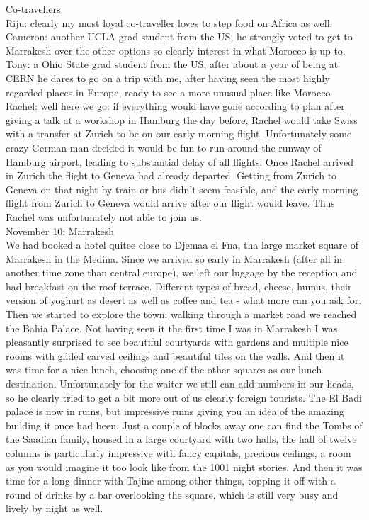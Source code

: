 Co-travellers:\\
Riju: clearly my most loyal co-traveller loves to step food on Africa as well.\\
Cameron: another UCLA grad student from the US, he strongly voted to get to Marrakesh over the other options so clearly interest in what Morocco is up to.\\
Tony: a Ohio State grad student from the US, after about a year of being at CERN he dares to go on a trip with me, after having seen the most highly regarded places in Europe, ready to see a more unusual place like Morocco\\
Rachel: well here we go: if everything would have gone according to plan after giving a talk at a workshop in Hamburg the day before, Rachel would take Swiss with a transfer at Zurich to be on our early morning flight. Unfortunately some crazy German man decided it would be fun to run around the runway of Hamburg airport, leading to substantial delay of all flights. Once Rachel arrived in Zurich the flight to Geneva had already departed. Getting from Zurich to Geneva on that night by train or bus didn't seem feasible, and the early morning flight from Zurich to Geneva would arrive after our flight would leave. Thus Rachel was unfortunately not able to join us.\\

November 10: Marrakesh\\
We had booked a hotel quitee close to Djemaa el Fna, tha large market square of Marrakesh in the Medina. Since we arrived so early in Marrakesh (after all in another time zone than central europe), we left our luggage by the reception and had breakfast on the roof terrace. Different types of bread, cheese, humus, their version of yoghurt as desert as well as coffee and tea - what more can you ask for. Then we started to explore the town: walking through a market road we reached the Bahia Palace. Not having seen it the first time I was in Marrakesh I was pleasantly surprised to see beautiful courtyards with gardens and multiple nice rooms with gilded carved ceilings and beautiful tiles on the walls. And then it was time for a nice lunch, choosing one of the other squares as our lunch destination. Unfortunately for the waiter we still can add numbers in our heads, so he clearly tried to get a bit more out of us clearly foreign tourists. The El Badi palace is now in ruins, but impressive ruins giving you an idea of the amazing building it once had been. Just a couple of blocks away one can find the Tombs of the Saadian family, housed in a large courtyard with two halls, the hall of twelve columns is particularly impressive with fancy capitals, precious ceilings, a room as you would imagine it too look like from the 1001 night stories. And then it was time for a long dinner with Tajine among other things, topping it off with a round of drinks by a bar overlooking the square, which is still very busy and lively by night as well.\\

